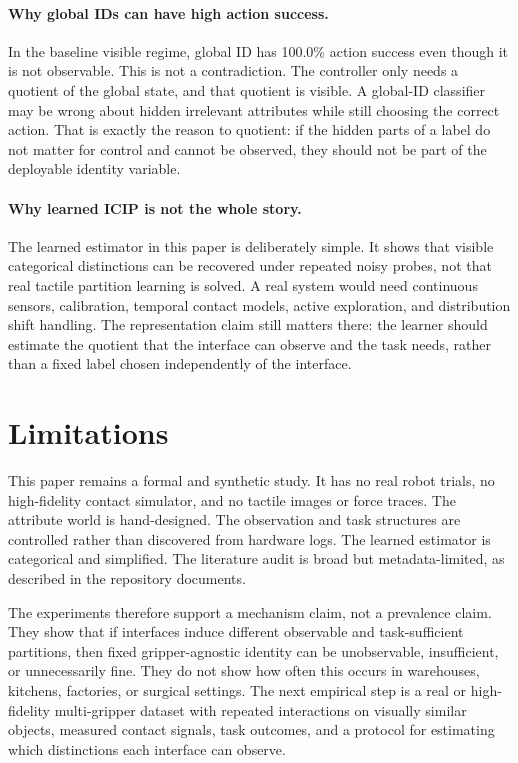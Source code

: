 \documentclass{article}
\newcommand{\icip}{\textsc{ICIP}}
\begin{document}
\paragraph{Why global IDs can have high action success.}
In the baseline visible regime, global ID has 100.0\% action success even though it is not observable.
This is not a contradiction.
The controller only needs a quotient of the global state, and that quotient is visible.
A global-ID classifier may be wrong about hidden irrelevant attributes while still choosing the correct action.
That is exactly the reason to quotient: if the hidden parts of a label do not matter for control and cannot be observed, they should not be part of the deployable identity variable.

\paragraph{Why learned \icip{} is not the whole story.}
The learned estimator in this paper is deliberately simple.
It shows that visible categorical distinctions can be recovered under repeated noisy probes, not that real tactile partition learning is solved.
A real system would need continuous sensors, calibration, temporal contact models, active exploration, and distribution shift handling.
The representation claim still matters there: the learner should estimate the quotient that the interface can observe and the task needs, rather than a fixed label chosen independently of the interface.

\section{Limitations}

This paper remains a formal and synthetic study.
It has no real robot trials, no high-fidelity contact simulator, and no tactile images or force traces.
The attribute world is hand-designed.
The observation and task structures are controlled rather than discovered from hardware logs.
The learned estimator is categorical and simplified.
The literature audit is broad but metadata-limited, as described in the repository documents.

The experiments therefore support a mechanism claim, not a prevalence claim.
They show that if interfaces induce different observable and task-sufficient partitions, then fixed gripper-agnostic identity can be unobservable, insufficient, or unnecessarily fine.
They do not show how often this occurs in warehouses, kitchens, factories, or surgical settings.
The next empirical step is a real or high-fidelity multi-gripper dataset with repeated interactions on visually similar objects, measured contact signals, task outcomes, and a protocol for estimating which distinctions each interface can observe.
\end{document}
